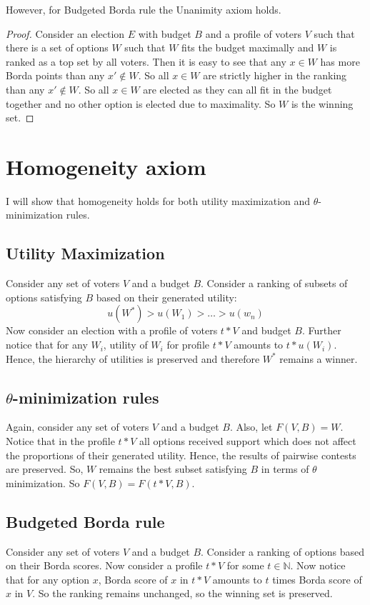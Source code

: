 \documentclass{article}
\begin{document}
However, for Budgeted Borda rule the Unanimity axiom holds.
\begin{proof}
	  Consider an election $E$ with budget $B$ and a profile of voters $V$ such that there is a set of options $W$ such that $W$ fits the budget maximally and $W$ is ranked as a top set by all voters. Then it is easy to see that any $x \in W$ has more Borda points than any $x' \notin W$. So all $x \in W$ are strictly higher in the ranking than any $x' \notin W$. So all $x \in W$ are elected as they can all fit in the budget together and no other option is elected due to maximality. So $W$ is the winning set. 
\end{proof}
\section{Homogeneity axiom}
I will show that homogeneity holds for both utility maximization and $\theta$-minimization rules.
\subsection{Utility Maximization}
Consider any set of voters $V$ and a budget $B$. Consider a ranking of subsets of options satisfying $B$ based on their generated utility:
$$ u(W^*) > u(W_1) > \dots > u(w_n)$$
Now consider an election with a profile of voters $t*V$ and budget $B$. Further notice that for any $W_i$, utility of $W_i$ for profile $t*V$ amounts to $t*u(W_i)$. Hence, the hierarchy of utilities is preserved and therefore $W^*$ remains a winner.
\subsection{$\theta$-minimization rules}
Again, consider any set of voters $V$ and a budget $B$. Also, let $F(V, B) = W$. Notice that in the profile $t*V$ all options received support which does not affect the proportions of their generated utility. Hence, the results of pairwise contests are preserved. So, $W$ remains the best subset satisfying $B$ in terms of $\theta$ minimization. So $F(V, B) = F(t*V, B)$.
\subsection{Budgeted Borda rule}
Consider any set of voters $V$ and a budget $B$. Consider a ranking of options  based on their Borda scores. Now consider a profile $t*V$ for some $t \in \mathbb{N}$. Now notice that for any option $x$, Borda score of $x$ in $t*V$ amounts to $t$ times Borda score of $x$ in $V$. So the ranking remains unchanged, so the winning set is preserved. 
\end{document}
